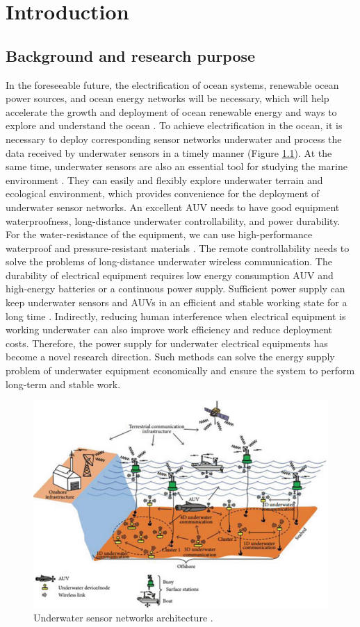 \chapter{Introduction}
\section{Background and research purpose}
In the foreseeable future, the electrification of ocean systems, renewable ocean power sources, and ocean energy networks will be necessary, which will help accelerate the growth and deployment of ocean renewable energy and ways to explore and understand the ocean \cite{Orekan, Randhawa2015}. To achieve electrification in the ocean, it is necessary to deploy corresponding sensor networks underwater and process the data received by underwater sensors in a timely manner (Figure \ref{fig:underwater sensor networks}). At the same time, underwater sensors are also an essential tool for studying the marine environment \cite{Heidemann2012, Wu2020}. They can easily and flexibly explore underwater terrain and ecological environment, which provides convenience for the deployment of underwater sensor networks. An excellent AUV needs to have good equipment waterproofness, long-distance underwater controllability, and power durability. For the water-resistance of the equipment, we can use high-performance waterproof and pressure-resistant materials \cite{Hwang2019, Tran2020}. The remote controllability needs to solve the problems of long-distance underwater wireless communication. The durability of electrical equipment requires low energy consumption AUV and high-energy batteries or a continuous power supply. Sufficient power supply can keep underwater sensors and AUVs in an efficient and stable working state for a long time \cite{Jurdak2006}. Indirectly, reducing human interference when electrical equipment is working underwater can also improve work efficiency and reduce deployment costs. Therefore, the power supply for underwater electrical equipments has become a novel research direction. Such methods can solve the energy supply problem of underwater equipment economically and ensure the system to perform long-term and stable work.

\begin{figure}[htbp]
    \centering
    \includegraphics[width=0.7\linewidth]{images/1_underwater_sensor_networks.png}
    \caption{Underwater sensor networks architecture \cite{Nayyar}.}
    \label{fig:underwater sensor networks}
\end{figure}

